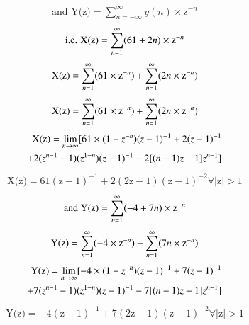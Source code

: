 \documentclass[journal,12pt,twocolumn]{IEEEtran}
\theoremstyle{remark}
\begin{document}
\begin{align}
\text{and Y(z)} = \sum_{n=-\infty}^{\infty} y(n)\times \text{z}^{-n}
\end{align}
\begin{align}
\notag \text{i.e. X(z)} = \sum_{n=1}^{\infty} (61 + 2n)\times \text{z}^{-n}
\end{align}
\begin{align}
\notag \text{X(z)} = \sum_{n=1}^{\infty}(61\times \text{z}^{-n}) + \sum_{n=1}^{\infty}(2n\times \text{z}^{-n})
\end{align}
\begin{align}
\notag \text{X(z)} = \sum_{n=1}^{\infty}(61\times \text{z}^{-n}) + \sum_{n=1}^{\infty}(2n\times \text{z}^{-n})
\end{align}
\begin{align}
\notag \text{X(z)} = \lim_{n\to\infty} [61\times(1-z^{-n})(z-1)^{-1}+ 2(z-1)^{-1}\\
+ 2(z^{n-1}-1)(z^{1-n})(z-1)^{-1}-2[(n-1)z+1]z^{n-1}]
\end{align}
\begin{align}
\boxed{\text{X(z)} = 61(\text{z}-1)^{-1} + 2(2\text{z}-1)(\text{z}-1)^{-2}  \forall  |\text{z}|>1}
\end{align}
\begin{align}
\notag \text{and Y(z)} = \sum_{n=1}^{\infty} (-4 + 7n)\times \text{z}^{-n}
\end{align}
\begin{align}
\notag \text{Y(z)} = \sum_{n=1}^{\infty}(-4\times \text{z}^{-n}) + \sum_{n=1}^{\infty}(7n\times \text{z}^{-n})
\end{align}
\begin{align}
\notag \text{Y(z)} = \lim_{n\to\infty} [-4\times(1-z^{-n})(z-1)^{-1}+ 7(z-1)^{-1}\\
+ 7(z^{n-1}-1)(z^{1-n})(z-1)^{-1}-7[(n-1)z+1]z^{n-1}]
\end{align}
\begin{align}
\boxed{\text{Y(z)} = -4(\text{z}-1)^{-1} + 7(2\text{z}-1)(\text{z}-1)^{-2} \forall  |\text{z}|>1}
\end{align}
\end{document}
